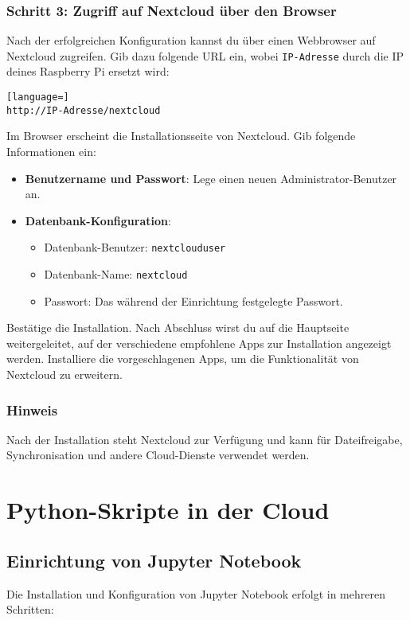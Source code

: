 \documentclass[a4paper,12pt]{article}
\begin{document}
\subsubsection{Schritt 3: Zugriff auf Nextcloud über den Browser}
Nach der erfolgreichen Konfiguration kannst du über einen Webbrowser auf Nextcloud zugreifen. Gib dazu folgende URL ein, wobei \texttt{IP-Adresse} durch die IP deines Raspberry Pi ersetzt wird:
\begin{lstlisting}[language=]
http://IP-Adresse/nextcloud
\end{lstlisting}

\noindent
Im Browser erscheint die Installationsseite von Nextcloud. Gib folgende Informationen ein:
\begin{itemize}
    \item \textbf{Benutzername und Passwort}: Lege einen neuen Administrator-Benutzer an.
    \item \textbf{Datenbank-Konfiguration}:
    \begin{itemize}
        \item Datenbank-Benutzer: \texttt{nextclouduser}
        \item Datenbank-Name: \texttt{nextcloud}
        \item Passwort: Das während der Einrichtung festgelegte Passwort.
    \end{itemize}
\end{itemize}

\noindent
Bestätige die Installation. Nach Abschluss wirst du auf die Hauptseite weitergeleitet, auf der verschiedene empfohlene Apps zur Installation angezeigt werden. Installiere die vorgeschlagenen Apps, um die Funktionalität von Nextcloud zu erweitern.

\subsubsection{Hinweis}
Nach der Installation steht Nextcloud zur Verfügung und kann für Dateifreigabe, Synchronisation und andere Cloud-Dienste verwendet werden.

\section{Python-Skripte in der Cloud}
\subsection{Einrichtung von Jupyter Notebook}
Die Installation und Konfiguration von Jupyter Notebook erfolgt in mehreren Schritten:
\end{document}

